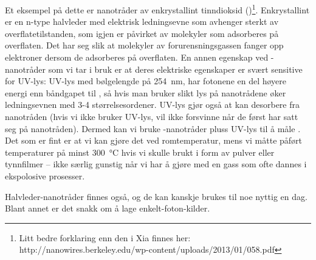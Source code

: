 Et eksempel på dette er nanotråder av enkrystallint tinndioksid ()\footnote{Litt bedre forklaring enn den i Xia finnes her: http://nanowires.berkeley.edu/wp-content/uploads/2013/01/058.pdf}.  Enkrystallint  er en n-type halvleder med elektrisk ledningsevne som avhenger sterkt av overflatetilstanden, som igjen er påvirket av molekyler som adsorberes på overflaten. Det har seg slik at molekyler av forurensningsgassen  fanger opp elektroner dersom de adsorberes på overflaten. En annen egenskap ved -nanotråder som vi tar i bruk er at deres elektriske egenskaper er svært sensitive for UV-lys: UV-lys med bølgelengde på \SI{254}{\nano\meter}, har fotonene en del høyere energi enn båndgapet til , så hvis man bruker slikt lys på nanotrådene øker ledningsevnen med 3-4 størrelsesordener. UV-lys gjør også at  kan desorbere fra nanotråden (hvis vi ikke bruker UV-lys, vil ikke  forsvinne når de først har satt seg på nanotråden). Dermed kan vi bruke -nanotråder pluss UV-lys til å måle . Det som er fint er at vi kan gjøre det ved romtemperatur, mens vi måtte påført temperaturer på minst \SI{300}{\celsius} hvis vi skulle brukt  i form av pulver eller tynnfilmer -- ikke særlig gunstig når vi har å gjøre med en gass som ofte dannes i ekspolosive prosesser.

Halvleder-nanotråder finnes også, og de kan kanskje brukes til noe nyttig en dag. Blant annet er det snakk om å lage enkelt-foton-kilder.



